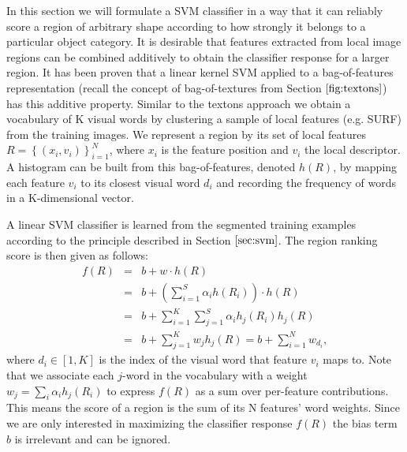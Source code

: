 \documentclass{SMBV13}
\begin{document}
In this section we will formulate a SVM classifier in a way that it can reliably score a region of arbitrary shape according to how strongly it belongs to a particular object category. It is desirable that features extracted from local image regions can be combined additively to obtain the classifier response for a larger region. It has been proven \cite{lampert2008beyond} that a linear kernel SVM applied to a bag-of-features representation (recall the concept of bag-of-textures from Section $\ref{fig:textons}$) has this additive property. Similar to the textons approach we obtain a vocabulary of K visual words by clustering a sample of local features (e.g. SURF) from the training images. We represent a region by its set of local features $R = \left\lbrace (x_i, v_i) \right\rbrace _{i=1} ^ N$, where $x_i$ is the feature position and $v_i$ the local descriptor. A histogram can be built from this bag-of-features, denoted $h(R)$, by mapping each feature $v_i$ to its closest visual word $d_i$ and recording the frequency of words in a K-dimensional vector.

A linear SVM classifier is learned from the segmented training examples according to the principle described in Section $\ref{sec:svm}$. The region ranking score is then given as follows:
\begin{equation}
\label{eq:svm_classifier}
\begin{array}{lcl}
f(R) & = & b + w \cdot h(R)\\
	 & = & b + (\sum\limits_{i = 1}^{S}\alpha_ih(R_i)) \cdot h(R)\\
     & = & b + \sum\limits_{i = 1}^{K}\sum\limits_{j = 1}^{S} \alpha_ih_j(R_i)h_j(R)\\
     & = & b + \sum\limits_{j = 1}^{K} w_jh_j(R) = b + \sum\limits_{i = 1}^{N} w_{d_i},
\end{array}
\end{equation}
where $d_i \in [1, K]$ is the index of the visual word that feature $v_i$ maps to. Note that we associate each $j$-word in the vocabulary with a weight $w_j = \sum_i \alpha_i h_j(R_i)$ to express $f(R)$ as a sum over per-feature contributions. This means the score of a region is the sum of its N features' word weights. Since we are only interested in maximizing the classifier response $f(R)$ the bias term $b$ is irrelevant and can be ignored.
\end{document}
